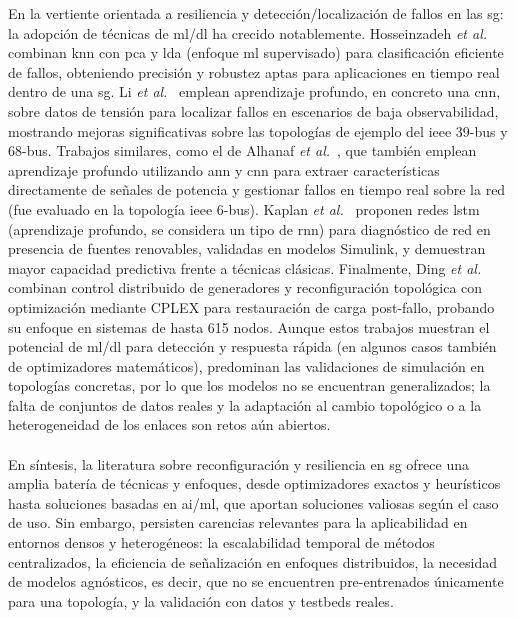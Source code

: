En la vertiente orientada a resiliencia y detección/localización de fallos en las \gls{sg}: la adopción de técnicas de \gls{ml}/\gls{dl} ha crecido notablemente. Hosseinzadeh \textit{et al.}~\cite{hosseinzadeh2019fault} combinan \gls{knn} con \gls{pca} y \gls{lda} (enfoque \gls{ml} supervisado) para clasificación eficiente de fallos, obteniendo precisión y robustez aptas para aplicaciones en tiempo real dentro de una \gls{sg}. Li \textit{et al.}~\cite{li2019real} emplean aprendizaje profundo, en concreto una \gls{cnn}, sobre datos de tensión para localizar fallos en escenarios de baja observabilidad, mostrando mejoras significativas sobre las topologías de ejemplo del \gls{ieee} 39-bus y 68-bus. Trabajos similares, como el de Alhanaf \textit{et al.}~\cite{alhanaf2023intelligent}, que también emplean aprendizaje profundo utilizando \gls{ann} y \gls{cnn} para extraer características directamente de señales de potencia y gestionar fallos en tiempo real sobre la red (fue evaluado en la topología \gls{ieee} 6-bus). Kaplan \textit{et al.}~\cite{kaplan2021fault} proponen redes \gls{lstm} (aprendizaje profundo, se considera un tipo de \gls{rnn}) para diagnóstico de red en presencia de fuentes renovables, validadas en modelos Simulink, y demuestran mayor capacidad predictiva frente a técnicas clásicas. Finalmente, Ding \textit{et al.}~\cite{ding2017resilient} combinan control distribuido de generadores y reconfiguración topológica con optimización mediante CPLEX para restauración de carga post-fallo, probando su enfoque en sistemas de hasta 615 nodos. Aunque estos trabajos muestran el potencial de \gls{ml}/\gls{dl} para detección y respuesta rápida (en algunos casos también de optimizadores matemáticos), predominan las validaciones de simulación en topologías concretas, por lo que los modelos no se encuentran generalizados; la falta de conjuntos de datos reales y la adaptación al cambio topológico o a la heterogeneidad de los enlaces son retos aún abiertos.\\
\\
En síntesis, la literatura sobre reconfiguración y resiliencia en \gls{sg} ofrece una amplia batería de técnicas y enfoques, desde optimizadores exactos y heurísticos hasta soluciones basadas en \gls{ai}/\gls{ml}, que aportan soluciones valiosas según el caso de uso. Sin embargo, persisten carencias relevantes para la aplicabilidad en entornos densos y heterogéneos: la escalabilidad temporal de métodos centralizados, la eficiencia de señalización en enfoques distribuidos, la necesidad de modelos agnósticos, es decir, que no se encuentren pre-entrenados únicamente para una topología, y la validación con datos y testbeds reales. \\
